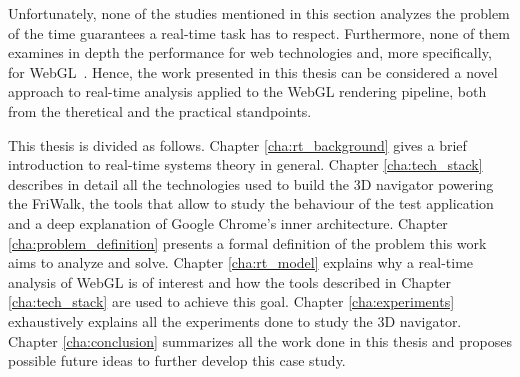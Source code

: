 Unfortunately, none of the studies mentioned in this section analyzes the problem
of the time guarantees a real-time task has to respect. Furthermore, none of them
examines in depth the performance for web technologies and, more specifically,
for WebGL~\cite{webgl}. Hence, the work presented in this thesis can be considered
a novel approach to real-time analysis applied to the WebGL rendering pipeline,
both from the theretical and the practical standpoints.

This thesis is divided as follows. Chapter \ref{cha:rt_background}
gives a brief introduction to real-time systems theory in general. Chapter
\ref{cha:tech_stack} describes in detail all the technologies used to build the
3D navigator powering the FriWalk, the tools that allow to study
the behaviour of the test application and a deep explanation of Google Chrome's
inner architecture. Chapter \ref{cha:problem_definition} presents a formal definition
of the problem this work aims to analyze and solve. Chapter \ref{cha:rt_model}
explains why a real-time analysis of WebGL is of interest and how the tools
described in Chapter \ref{cha:tech_stack} are used to achieve this goal.
Chapter \ref{cha:experiments} exhaustively explains all the experiments done to
study the 3D navigator. Chapter \ref{cha:conclusion} summarizes all the work
done in this thesis and proposes possible future ideas to further develop this
case study.
